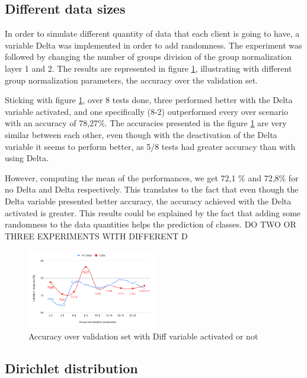 \documentclass[twocolumn]{article}
\begin{document}
\subsection{Different data sizes}
In order to simulate different quantity of data that each client is going to have, a variable Delta was implemented in order to add randomness. The experiment was followed by changing the number of groups division of the group normalization layer 1 and 2. The results are represented in figure \ref{AccDiff}, illustrating with different group normalization parameters, the accuracy over the validation set. 

Sticking with figure \ref{AccDiff}, over 8 tests done, three performed better with the Delta variable activated, and one specifically (8-2) outperformed every over scenario with an accuracy of 78,27\%. The accuracies presented in the figure \ref{AccDiff} are very similar between each other, even though with the deactivation of the Delta variable it seems to perform better, as 5/8 tests had greater accuracy than with using Delta.

However, computing the mean of the performances, we get 72,1 \% and 72,8\% for no Delta and Delta respectively. This translates to the fact that even though the Delta variable presented better accuracy, the accuracy achieved with the Delta activated is greater. This results could be explained by the fact that adding some randomness to the data quantities helps the prediction of classes.
DO TWO OR THREE EXPERIMENTS WITH DIFFERENT D

\begin{figure}
    \centering
    \includegraphics[width=0.5\textwidth,height=.3\textheight]{groupnormalizationDeltaNoDelta.png}
    \caption{Accuracy over validation set with Diff variable activated or not}
     \label{AccDiff} 
\end{figure}

\subsection{Dirichlet distribution}
\end{document}
